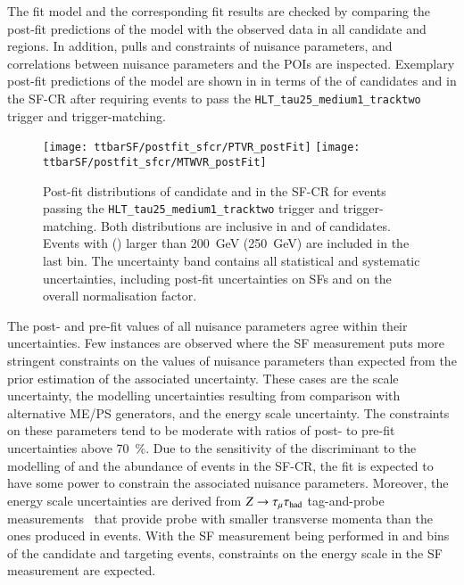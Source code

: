 The fit model and the corresponding fit results are checked by comparing the
post-fit predictions of the model with the observed data in all \tauhadvis
candidate \Ntracks and \pT regions. In addition, pulls and constraints of
nuisance parameters, and correlations between nuisance parameters and the POIs
are inspected. Exemplary post-fit predictions of the model are shown in
 in terms of the \pT of \tauhadvis candidates
and \mTW in the SF-CR after requiring events to pass the
\texttt{HLT\_tau25\_medium1\_tracktwo} trigger and trigger-matching.

\begin{figure}[htbp]
  \centering

  \texttt{[image: ttbarSF/postfit\_sfcr/PTVR\_postFit]}
  \texttt{[image: ttbarSF/postfit\_sfcr/MTWVR\_postFit]}

  \caption[Post-fit distributions of \tauhadvis candidate \pT and \mTW in the
  SF-CR.]{Post-fit distributions of \tauhadvis candidate \pT and \mTW in the
    SF-CR for events passing the \texttt{HLT\_tau25\_medium1\_tracktwo} trigger
    and trigger-matching. Both distributions are inclusive in \Ntracks and \pT
    of \tauhadvis candidates. Events with \tauhadvis \pT (\mTW) larger than
    \SI{200}{\GeV} (\SI{250}{\GeV}) are included in the last bin. The
    uncertainty band contains all statistical and systematic uncertainties,
    including post-fit uncertainties on \faketauhadvis SFs and on the overall
    \ttbar normalisation factor.}%
  \label{fig:ttbarSF_postfit_ptmtw}
\end{figure}

The post- and pre-fit values of all nuisance parameters agree within their
uncertainties. Few instances are observed where the SF measurement puts more
stringent constraints on the values of nuisance parameters than expected from
the prior estimation of the associated uncertainty. These cases are the
\pTmissAbs scale uncertainty, the \ttbar modelling uncertainties resulting from
comparison with alternative ME/PS generators, and the \tauhadvis energy scale
uncertainty. The constraints on these parameters tend to be moderate with ratios
of post- to pre-fit uncertainties above \SI{70}{\percent}. Due to the
sensitivity of the \mTW discriminant to the modelling of \pTmissAbs and the
abundance of \ttbar events in the SF-CR, the fit is expected to have some power
to constrain the associated nuisance parameters. Moreover, the \tauhadvis energy
scale uncertainties are derived from $Z \rightarrow \tau_{\mu} \tau_{\text{had}}$ tag-and-probe
measurements~\cite{ATLAS-CONF-2017-029} that provide probe \tauhadvis with
smaller transverse momenta than the ones produced in \ttbar events. With the SF
measurement being performed in \Ntracks and \pT bins of the \tauhadvis candidate
and targeting \ttbar events, constraints on the \tauhadvis energy scale in the
SF measurement are expected.

